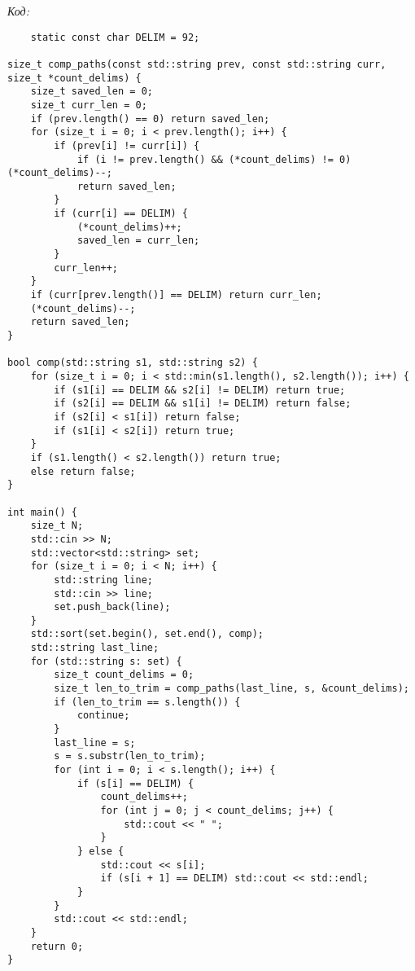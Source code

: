 \textit{Код:}
\small
\begin{center}
    \begin{verbatim}
    static const char DELIM = 92;

size_t comp_paths(const std::string prev, const std::string curr, size_t *count_delims) {
    size_t saved_len = 0;
    size_t curr_len = 0;
    if (prev.length() == 0) return saved_len;
    for (size_t i = 0; i < prev.length(); i++) {
        if (prev[i] != curr[i]) {
            if (i != prev.length() && (*count_delims) != 0) (*count_delims)--;
            return saved_len;
        }
        if (curr[i] == DELIM) {
            (*count_delims)++;
            saved_len = curr_len;
        }
        curr_len++;
    }
    if (curr[prev.length()] == DELIM) return curr_len;
    (*count_delims)--;
    return saved_len;
}

bool comp(std::string s1, std::string s2) {
    for (size_t i = 0; i < std::min(s1.length(), s2.length()); i++) {
        if (s1[i] == DELIM && s2[i] != DELIM) return true;
        if (s2[i] == DELIM && s1[i] != DELIM) return false;
        if (s2[i] < s1[i]) return false;
        if (s1[i] < s2[i]) return true;
    }
    if (s1.length() < s2.length()) return true;
    else return false;
}

int main() {
    size_t N;
    std::cin >> N;
    std::vector<std::string> set;
    for (size_t i = 0; i < N; i++) {
        std::string line;
        std::cin >> line;
        set.push_back(line);
    }
    std::sort(set.begin(), set.end(), comp);
    std::string last_line;
    for (std::string s: set) {
        size_t count_delims = 0;
        size_t len_to_trim = comp_paths(last_line, s, &count_delims);
        if (len_to_trim == s.length()) {
            continue;
        }
        last_line = s;
        s = s.substr(len_to_trim);
        for (int i = 0; i < s.length(); i++) {
            if (s[i] == DELIM) {
                count_delims++;
                for (int j = 0; j < count_delims; j++) {
                    std::cout << " ";
                }
            } else {
                std::cout << s[i];
                if (s[i + 1] == DELIM) std::cout << std::endl;
            }
        }
        std::cout << std::endl;
    }
    return 0;
}
    \end{verbatim}
\end{center}
\normalsize
\newpage

